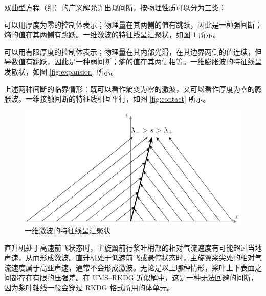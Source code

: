 双曲型方程（组）的广义解允许出现间断，按物理性质可以分为三类：
\begin{description}[wide]
\item [{激波}] 可以用厚度为零的控制体表示；物理量在其两侧的值有跳跃，因此是一种强间断；熵的值在其两侧有跳跃。一维激波的特征线呈汇聚状，如图
\ref{fig:shock} 所示。
\item [{膨胀波}] 可以用有限厚度的控制体表示；物理量在其内部光滑，在其边界两侧的值连续，但导数值有跳跃，因此是一种弱间断；熵的值在其两侧相等。一维膨胀波的特征线呈发散状，如图
\ref{fig:expansion} 所示。
\item [{接触间断}] 上述两种间断的临界情形：既可以看作熵变为零的激波，又可以看作厚度为零的膨胀波。一维接触间断的特征线相互平行，如图
\ref{fig:contact} 所示。
\end{description}

\begin{figure}[h!]
\begin{centering}
\includegraphics[width=1\textheight,height=0.26\textheight,keepaspectratio]{figures/shock}
\par\end{centering}
\caption{\label{fig:shock}一维激波的特征线呈汇聚状}
\end{figure}

直升机处于高速前飞状态时，主旋翼前行桨叶梢部的相对气流速度有可能超过当地声速，从而形成激波。直升机处于低速前飞或悬停状态时，主旋翼桨尖处的相对气流速度属于高亚声速，通常不会形成激波。无论是以上哪种情形，桨叶上下表面之间都存在有限的压强差。在
UMS–RKDG 近似解中，这是一种无法回避的间断，因为桨叶轴线一般会穿过 RKDG 格式所用的体单元。

